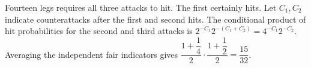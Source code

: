 Fourteen legs requires all three attacks to hit. The first certainly hits. Let $C_1,C_2$ indicate counterattacks after the first and second hits. The conditional product of hit probabilities for the second and third attacks is $2^{-C_1}2^{-(C_1+C_2)}=4^{-C_1}2^{-C_2}$. Averaging the independent fair indicators gives $\dfrac{1+\dfrac{1}{4}}{2}\cdot\dfrac{1+\dfrac{1}{2}}{2}=\boxed{\dfrac{15}{32}}$.
